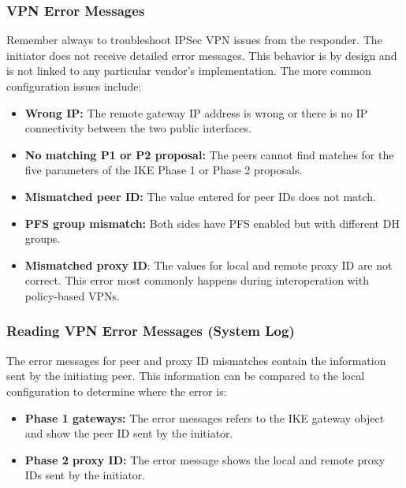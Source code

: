 \subsubsection{VPN Error Messages}
Remember always to troubleshoot IPSec VPN issues from the responder. The initiator does not receive detailed error messages.
This behavior is by design and is not linked to any particular vendor's implementation.
The more common configuration issues include:
\begin{itemize}
    \item \textbf{Wrong IP:} The remote gateway IP address is wrong or there is no IP connectivity between the two public interfaces.
    \item \textbf{No matching P1 or P2 proposal:} The peers cannot find matches for the five parameters of the IKE Phase 1 or Phase 2 proposals.
    \item \textbf{Mismatched peer ID:} The value entered for peer IDs does not match.
    \item \textbf{PFS group mismatch:} Both sides have PFS enabled but with different DH groups.
    \item \textbf{Mismatched proxy ID}: The values for local and remote proxy ID are not correct. This error most commonly happens during interoperation with policy-based VPNs.
\end{itemize}

\subsubsection{Reading VPN Error Messages (System Log)}
The error messages for peer and proxy ID mismatches contain the information sent by the initiating peer. 
This information can be compared to the local configuration to determine where the error is:
\begin{itemize}
    \item \textbf{Phase 1 gateways:} The error messages refers to the IKE gateway object and show the peer ID sent by the initiator. 
    \item \textbf{Phase 2 proxy ID:} The error message shows the local and remote proxy IDs sent by the initiator.
\end{itemize}